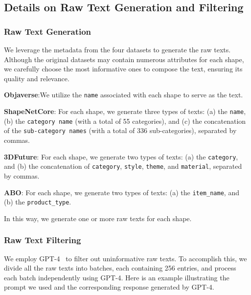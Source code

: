 \subsection{Details on Raw Text Generation and Filtering}

\subsubsection{Raw Text Generation}
We leverage the metadata from the four datasets to generate the raw texts. Although the original datasets may contain numerous attributes for each shape, we carefully choose the most informative ones to compose the text, ensuring its quality and relevance.

\noindent \textbf{Objaverse}:We utilize the \texttt{name} associated with each shape to serve as the text.

\noindent \textbf{ShapeNetCore}: For each shape, we generate three types of texts: (a) the \texttt{name}, (b) the \texttt{category name} (with a total of 55 categories), and (c) the concatenation of the \texttt{sub-category names} (with a total of 336 sub-categories), separated by commas.

\noindent \textbf{3DFuture}: For each shape, we generate two types of texts: (a) the \texttt{category}, and (b) the concatenation of \texttt{category}, \texttt{style}, \texttt{theme}, and \texttt{material},  separated by commas.

\noindent \textbf{ABO}:  
For each shape, we generate two types of texts: (a) the \texttt{item\_name}, and (b) the \texttt{product\_type}.

In this way, we generate one or more raw texts for each shape.

\subsubsection{Raw Text Filtering}

We employ GPT-4~\cite{openai2023gpt4} to filter out uninformative raw texts. To accomplish this, we divide all the raw texts into batches, each containing 256 entries, and process each batch independently using GPT-4. Here is an example illustrating the prompt we used and the corresponding response generated by GPT-4. 

